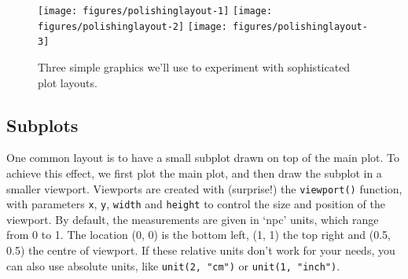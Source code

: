 \begin{Shaded}
\begin{Highlighting}[]
\StringTok{ }  \NormalTok{))}
\StringTok{ } \StringTok{ }
\StringTok{  }\NormalTok{(} 
\StringTok{ } \NormalTok{))}
\end{Highlighting}
\end{Shaded}

\begin{figure}

{\centering \texttt{[image: figures/polishinglayout-1]} \texttt{[image: figures/polishinglayout-2]} \texttt{[image: figures/polishinglayout-3]} 

}

\caption{Three simple graphics we'll use to experiment with sophisticated plot layouts.\label{fig:layout}}
\end{figure}

\subsection{Subplots}

One common layout is to have a small subplot drawn on top of the main
plot. To achieve this effect, we first plot the main plot, and then draw
the subplot in a smaller viewport. Viewports are created with
(surprise!) the \texttt{viewport()} function, with parameters
\texttt{x}, \texttt{y}, \texttt{width} and \texttt{height} to control
the size and position of the viewport. By default, the measurements are
given in `npc' units, which range from 0 to 1. The location (0, 0) is
the bottom left, (1, 1) the top right and (0.5, 0.5) the centre of
viewport. If these relative units don't work for your needs, you can
also use absolute units, like \texttt{unit(2, "cm")} or
\texttt{unit(1, "inch")}.  


